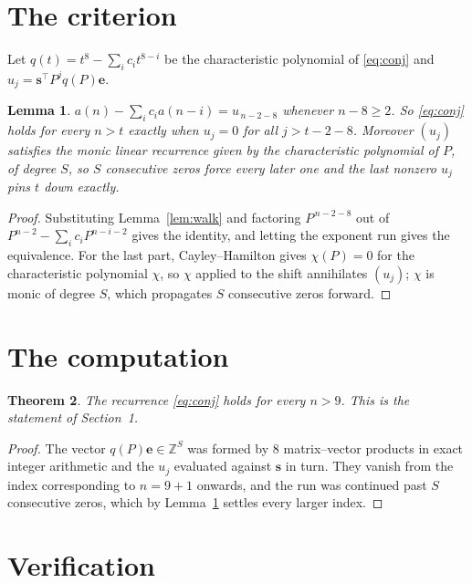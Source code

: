 \documentclass[11pt,a4paper]{article}
\theoremstyle{plain}
\newtheorem{theorem}{Theorem}
\newtheorem{lemma}[theorem]{Lemma}
\theoremstyle{definition}
\begin{document}
\section{The criterion}

Let $q(t)=t^{8}-\sum_i c_i t^{8-i}$ be the characteristic polynomial of
\eqref{eq:conj} and $u_j=\mathbf{s}^{\!\top}P^{j}q(P)\mathbf{e}$.

\begin{lemma}\label{lem:crit}
$a(n)-\sum_i c_i a(n-i)=u_{\,n-2-8}$ whenever $n-8\ge2$. So \eqref{eq:conj}
holds for every $n>t$ exactly when $u_j=0$ for all $j>t-2-8$. Moreover $(u_j)$
satisfies the monic linear recurrence given by the characteristic polynomial of $P$, of
degree $S$, so $S$ consecutive zeros force every later one and the last nonzero $u_j$ pins
$t$ down exactly.
\end{lemma}

\begin{proof}
Substituting Lemma~\ref{lem:walk} and factoring $P^{\,n-2-8}$ out of
$P^{n-2}-\sum_i c_i P^{n-i-2}$ gives the identity, and letting the exponent run gives the
equivalence. For the last part, Cayley--Hamilton gives $\chi(P)=0$ for the characteristic
polynomial $\chi$, so $\chi$ applied to the shift annihilates $(u_j)$; $\chi$ is monic of
degree $S$, which propagates $S$ consecutive zeros forward.
\end{proof}

\section{The computation}

\begin{theorem}
The recurrence \eqref{eq:conj} holds for every $n>9$. This is the statement of
Section~1.
\end{theorem}

\begin{proof}
The vector $q(P)\mathbf{e}\in\mathbb{Z}^{S}$ was formed by $8$ matrix--vector
products in exact integer arithmetic and the $u_j$ evaluated against $\mathbf{s}$ in turn.
They vanish from the index corresponding to $n=9+1$ onwards, and the run was continued
past $S$ consecutive zeros, which by Lemma~\ref{lem:crit} settles every larger index.
\end{proof}

\section{Verification}
\end{document}
